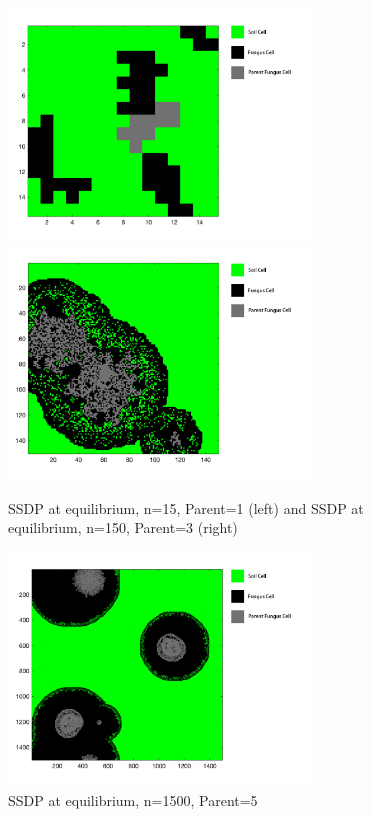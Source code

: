 \documentclass[12pt]{article}
\begin{document}
\begin{figure}[!htbp]
	\small
	\centering
	\includegraphics[width=8cm]{./pictures/cell1.png}
	\includegraphics[width=8cm]{./pictures/cell2.png}
	\caption{SSDP at equilibrium, n=15, Parent=1 (left) and SSDP at equilibrium, n=150, Parent=3 (right)}\label{nt}
\end{figure}

\begin{figure}[H]
	\small
	\centering
	\includegraphics[width=8cm]{./pictures/cell3.png}
	\caption{SSDP at equilibrium, n=1500, Parent=5}\label{jj}
\end{figure}
\end{document}
